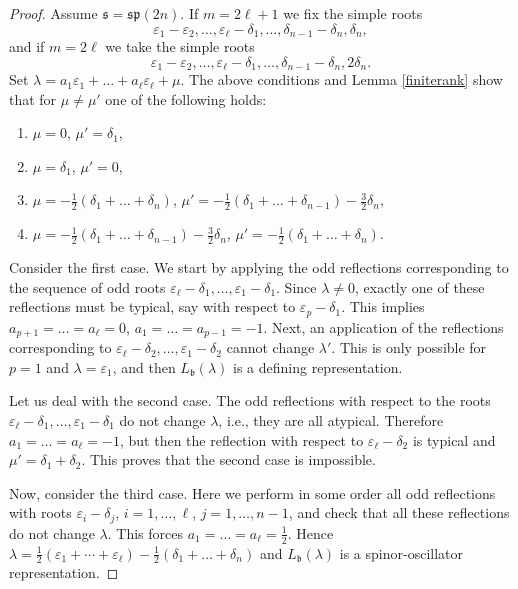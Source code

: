 \documentclass[12pt]{amsart}
\makeatletter
\def\@putname#1#2#3#4{\def\@@ref{#3}\let\old@bf\bf
        \def\bf##1{\old@bf\if?\noexpand##1?{#4}\else##1\fi}%
	#1{#2}%
        \let\bf\old@bf}
\def\@putname#1#2#3#4{\def\@@ref{#3}\let\old@bf\bf	%
	\let\old@reset@font\reset@font			%
        \def\bf##1{\old@bf\if?\noexpand##1?{#4}\else##1\fi}%
	\def\reset@font##1##2{\old@reset@font##1\if?\noexpand##2?{#4}\else##2\fi}#1{#2}%
        \let\bf\old@bf\let\reset@font\old@reset@font}
\let\my@ref=\ref
\def\ref#1{\@putname\my@ref{#1}{#1}{\tiny\rm\@@ref}}
\theoremstyle{plain} %
\numberwithin{equation}{section}
\theoremstyle{definition}
\theoremstyle{remark}
\theoremstyle{plain} %
\newcommand{\gs}{\mathfrak{s}}
\def\gb{\mathfrak{b}}
\def\gs{\mathfrak{s}}
\makeatother
\begin{document}
\begin{proof}
  Assume $\gs=\mathfrak{sp}(2n)$. If $m=2\ell+1$  we fix the simple roots
  $$\varepsilon_1-\varepsilon_2,\dots,\varepsilon_\ell-\delta_1,\dots, \delta_{n-1}-\delta_n,\delta_n,$$
  and if $m=2\ell$ we take the simple roots
  $$\varepsilon_1-\varepsilon_2,\dots,\varepsilon_\ell-\delta_1,\dots, \delta_{n-1}-\delta_n,2\delta_n.$$
Set $\lambda=a_1\varepsilon_1+\dots +a_\ell\varepsilon_\ell+\mu$.  The  above conditions and Lemma \ref{finiterank} show that for $\mu \neq \mu'$ one of the following holds:

  \begin{enumerate}
  \item $\mu=0$, $\mu'=\delta_1$,
    \item $\mu=\delta_1$, $\mu'=0$,
\item $\mu=-\frac{1}{2}(\delta_1+\dots+\delta_{n})$, $\mu'=-\frac{1}{2}(\delta_1+\dots+\delta_{n-1})-\frac{3}{2}\delta_n$,
    \item $\mu=-\frac{1}{2}(\delta_1+\dots+\delta_{n-1})-\frac{3}{2}\delta_n$, $\mu'=-\frac{1}{2}(\delta_1+\dots+\delta_{n})$.
  
  \end{enumerate}

  Consider the first case. We start by applying the odd reflections corresponding to the sequence of odd roots $\varepsilon_\ell - \delta_1,\dots,\varepsilon_1-\delta_1$. Since $\lambda \neq 0$, exactly  one of these reflections must be typical,
  say with respect to $\varepsilon_p-\delta_1$. This implies $a_{p+1}=\dots=a_{\ell}=0$, $a_1=\dots=a_{p-1}=-1$.  Next, an application of the reflections corresponding to $\varepsilon_\ell - \delta_2,\dots,\varepsilon_1 - \delta_2$ cannot change $\lambda'$. This is only possible
  for $p=1$ and $\lambda=\varepsilon_1$, and then $L_{\gb}(\lambda)$ is a defining representation.

 Let us deal with the second case. The odd reflections with respect to the roots $\varepsilon_\ell - \delta_1,\dots,\varepsilon_1-\delta_1$ do not change $\lambda$, i.e., they are all atypical. Therefore $a_1=\dots=a_\ell=-1$, but then the reflection with respect to $\varepsilon_\ell - \delta_2$ is typical and
  $\mu'=\delta_1+\delta_2$. This proves that the second case is impossible.

  Now, consider the third case. Here we perform in some order all odd reflections with roots $\varepsilon_i  - \delta_j$,  $i=1,\dots,\ell$,  $j=1,\dots,n-1$, and check that all these reflections do not change $\lambda$. This forces
  $a_1=\dots=a_\ell=\frac{1}{2}$. Hence $\lambda = \frac{1}{2} \left(\varepsilon_1+\cdots +\varepsilon_\ell\right)  -\frac{1}{2}(\delta_1+\dots+\delta_{n})$ and  
  $L_{\gb}(\lambda)$ is a spinor-oscillator representation.


\end{proof}
\end{document}
